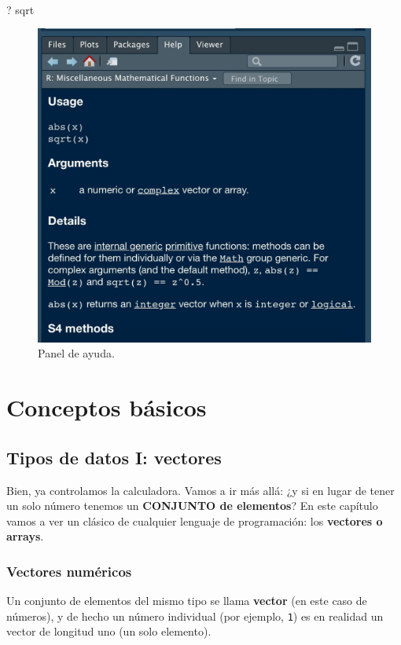 \documentclass[11pt,]{book}
\newenvironment{Shaded}{\begin{snugshade}}{\end{snugshade}}
\newcommand{\NormalTok}[1]{#1}
\begin{document}
~

\begin{Shaded}
\begin{Highlighting}[]
\NormalTok{? sqrt}
\end{Highlighting}
\end{Shaded}

\begin{figure}

{\centering \includegraphics[width=0.5\linewidth]{./img/panel_ayuda} 

}

\caption{Panel de ayuda.}\label{fig:unnamed-chunk-9}
\end{figure}

\hypertarget{part-conceptos-buxe1sicos}{%
\part{Conceptos básicos}\label{part-conceptos-buxe1sicos}}

\hypertarget{tipos-de-datos-i-vectores}{%
\chapter{Tipos de datos I: vectores}\label{tipos-de-datos-i-vectores}}

Bien, ya controlamos la calculadora. Vamos a ir más allá: ¿y si en lugar de tener un solo número tenemos un \textbf{CONJUNTO de elementos}? En este capítulo vamos a ver un clásico de cualquier lenguaje de programación: los \textbf{vectores o arrays}.

\hypertarget{vectores-numuxe9ricos}{%
\section{Vectores numéricos}\label{vectores-numuxe9ricos}}

Un conjunto de elementos del mismo tipo se llama \textbf{vector} (en este caso de números), y de hecho un número individual (por ejemplo, \texttt{1}) es en realidad un vector de longitud uno (un solo elemento).
\end{document}
